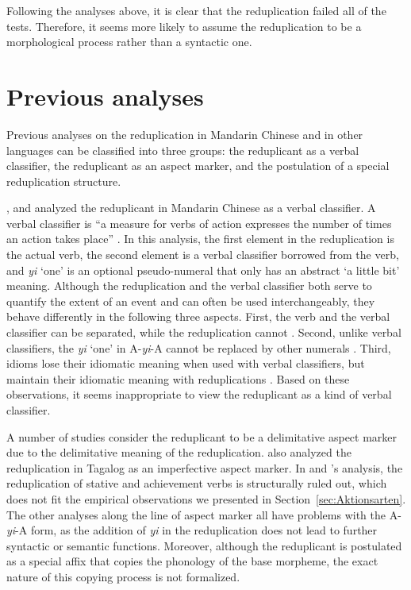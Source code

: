 \documentclass[11pt,a4paper,fleqn,draft]{article}
\begin{document}
Following the analyses above, it is clear that the reduplication failed all of the tests. 
Therefore, it seems more likely to assume the reduplication to be a morphological process rather than a syntactic one. 




\section{Previous analyses}\label{ch:prev}

Previous analyses on the reduplication in Mandarin Chinese and in other languages can be classified
into three groups: the reduplicant as a verbal classifier, the reduplicant as an aspect marker, and
the postulation of a special reduplication structure.


\citet{Chao1968}, \citet{Fan1964} and \citet{Xiong2016} analyzed the reduplicant in Mandarin Chinese
as a verbal classifier. 
A verbal classifier is ``a measure for verbs of action expresses the number of times an action takes place” \citep[615]{Chao1968}.
In this analysis, the first element in the reduplication is the actual verb, 
the second element is a verbal classifier borrowed from the verb, 
and \emph{yi} `one' is an optional pseudo-numeral that only has an abstract `a little bit' meaning.
Although the reduplication and the verbal classifier both serve to quantify the extent of an event and can often be used interchangeably, 
they behave differently in the following three aspects.
First, the verb and the verbal classifier can be separated, while the reduplication cannot \citep[269]{Paris2013}.
Second, unlike verbal classifiers, the \emph{yi} ‘one’ in A-\emph{yi}-A cannot be replaced by other numerals \citep[299--230]{YangWei2017}.
Third, idioms lose their idiomatic meaning when used with verbal classifiers, 
but maintain their idiomatic meaning with reduplications \citep[230--231]{YangWei2017}.
Based on these observations, it seems inappropriate to view the reduplicant as a kind of verbal classifier.


A number of studies consider the reduplicant to be a delimitative aspect marker \citep{Arcodiaetal2014, BascianoMelloni2017, YangWei2017} 
due to the delimitative meaning of the reduplication. 
\citet{Travis1999, Travis2000} also analyzed the reduplication in Tagalog as an imperfective aspect marker.
In \citet{Arcodiaetal2014} and \citet{BascianoMelloni2017}'s analysis, 
the reduplication of stative and achievement verbs is structurally ruled out,
which does not fit the empirical observations we presented in Section~\ref{sec:Aktionsarten}.
The other analyses along the line of aspect marker all have problems with the A-\emph{yi}-A form, 
as the addition of \emph{yi} in the reduplication does not lead to further syntactic or semantic functions.
Moreover, although the reduplicant is postulated as a special affix that copies the phonology of the base morpheme,
the exact nature of this copying process is not formalized.
\end{document}
